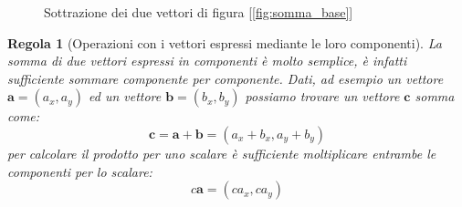 \documentclass[a4paper,10pt,oneside]{article}
\newtheorem{regola}{Regola}
\begin{document}
\begin{figure}[H]
\caption{Sottrazione dei due vettori di figura [\ref{fig:somma_base}]}
\end{figure}



\begin{regola}[Operazioni con i vettori espressi mediante le loro componenti]
La somma di due vettori espressi in componenti è molto semplice, è infatti sufficiente sommare componente per componente. Dati, ad esempio un vettore $\mathbf{a}=(a_x,a_y)$ ed un vettore $\mathbf{b}=(b_x,b_y)$ possiamo trovare un vettore $\mathbf{c}$ somma come:
\begin{equation*}
 \mathbf{c}=\mathbf{a}+\mathbf{b}=(a_x+b_x,a_y+b_y)
\end{equation*}
per calcolare il prodotto per uno scalare è sufficiente moltiplicare entrambe le componenti per lo scalare:
\begin{equation*}
 c\mathbf{a}=(ca_x,ca_y)
\end{equation*}


\end{regola}
\end{document}
